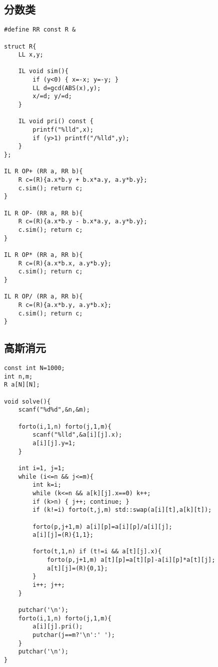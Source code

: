 \documentclass{article}
\begin{document}
\subsection{分数类}
\begin{lstlisting}
#define RR const R &

struct R{
	LL x,y;

	IL void sim(){ 
		if (y<0) { x=-x; y=-y; }
		LL d=gcd(ABS(x),y);
		x/=d; y/=d;
	}

	IL void pri() const {
		printf("%lld",x);
		if (y>1) printf("/%lld",y);
	}
};

IL R OP+ (RR a, RR b){
	R c=(R){a.x*b.y + b.x*a.y, a.y*b.y};
	c.sim(); return c;
}

IL R OP- (RR a, RR b){
	R c=(R){a.x*b.y - b.x*a.y, a.y*b.y};
	c.sim(); return c;
}

IL R OP* (RR a, RR b){
	R c=(R){a.x*b.x, a.y*b.y};
	c.sim(); return c;
}

IL R OP/ (RR a, RR b){
	R c=(R){a.x*b.y, a.y*b.x};
	c.sim(); return c;
}
\end{lstlisting}

\subsection{高斯消元}
\begin{lstlisting}
const int N=1000;
int n,m;
R a[N][N];

void solve(){
	scanf("%d%d",&n,&m);
	
	forto(i,1,n) forto(j,1,m){
		scanf("%lld",&a[i][j].x);
		a[i][j].y=1;
	}
	 
	int i=1, j=1;
	while (i<=n && j<=m){
		int k=i;
		while (k<=n && a[k][j].x==0) k++;
		if (k>n) { j++; continue; }
		if (k!=i) forto(t,j,m) std::swap(a[i][t],a[k][t]);
		
		forto(p,j+1,m) a[i][p]=a[i][p]/a[i][j];
		a[i][j]=(R){1,1};
		
		forto(t,1,n) if (t!=i && a[t][j].x){
			forto(p,j+1,m) a[t][p]=a[t][p]-a[i][p]*a[t][j];
			a[t][j]=(R){0,1};
		}
		i++; j++;
	}
	
	putchar('\n');
	forto(i,1,n) forto(j,1,m){
		a[i][j].pri();
		putchar(j==m?'\n':' ');
	}
	putchar('\n');
}
\end{lstlisting}
\end{document}
